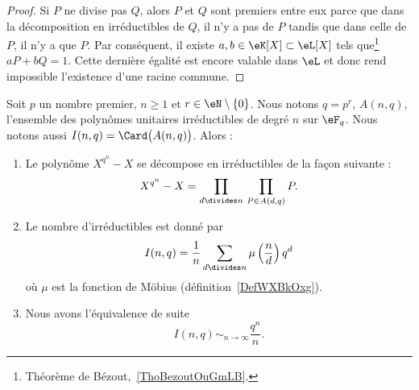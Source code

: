 \begin{proof}
	Si \( P\) ne divise pas \( Q\), alors \( P\) et \( Q\) sont premiers entre eux parce que dans la décomposition en irréductibles de \( Q\), il n'y a pas de \( P\) tandis que dans celle de \( P\), il n'y a que \( P\). Par conséquent, il existe \( a,b\in \eK[X]\subset\eL[X]\) tels que\footnote{Théorème de Bézout,~\ref{ThoBezoutOuGmLB}.} \( aP+bQ=1\). Cette dernière égalité est encore valable dans \( \eL\) et donc rend impossible l'existence d'une racine commune.
\end{proof}

\begin{proposition} \label{PropVFNOvzZ}
	Soit \( p\) un nombre premier, \( n\geq 1\) et \( r\in \eN\setminus\{ 0 \}\). Nous notons \( q=p^r\), \( A(n,q)\), l'ensemble des polynômes unitaires irréductibles de degré \( n\) sur \( \eF_q\). Nous notons aussi \( I(n,q)=\Card\big( A(n,q) \big)\). Alors :
	\begin{enumerate}
		\item
		      Le polynôme \( X^{q^n}-X\) se décompose en irréductibles de la façon suivante :
		      \begin{equation}
			      X^{q^n}-X=\prod_{d\divides n}\,\prod_{P\in A(d,q)}P.
		      \end{equation}
		\item
		      Le nombre d'irréductibles est donné par
		      \begin{equation}
			      I(n,q)=\frac{1}{ n }\sum_{d\divides n}\mu\left( \frac{ n }{ d } \right)q^d
		      \end{equation}
		      où \( \mu\) est la fonction de Möbius (définition~\ref{DefWXBkOxg}).
		\item
		      Nous avons l'équivalence de suite
		      \begin{equation}
			      I(n,q)\sim_{n\to\infty}\frac{ q^n }{ n }.
		      \end{equation}
	\end{enumerate}
\end{proposition}

